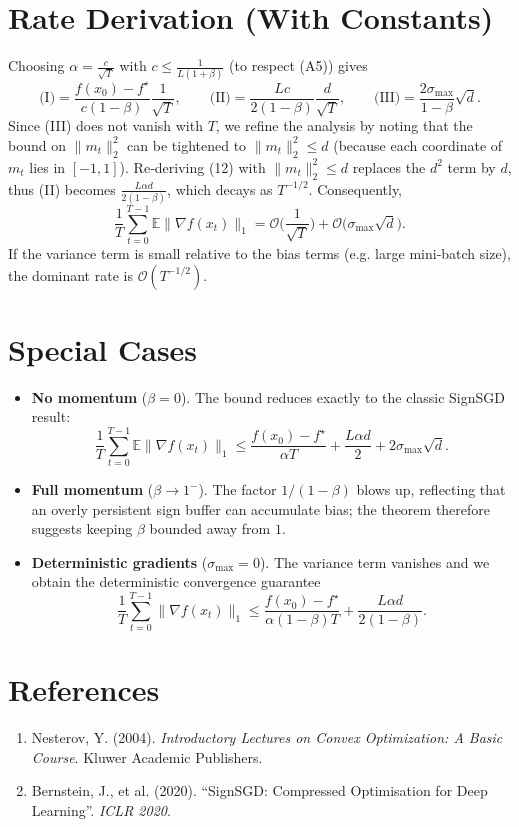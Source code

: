 \documentclass[11pt]{article}
\begin{document}
\section*{Rate Derivation (With Constants)}
Choosing $\alpha = \frac{c}{\sqrt{T}}$ with $c\le \frac{1}{L(1+\beta)}$ (to respect (A5)) gives
\[
\text{(I)} = \frac{f(x_{0})-f^{\star}}{c(1-\beta)}\frac{1}{\sqrt{T}},\qquad
\text{(II)} = \frac{L c}{2(1-\beta)}\frac{d}{\sqrt{T}},\qquad
\text{(III)} = \frac{2\sigma_{\max}}{1-\beta}\sqrt{d}.
\]
Since (III) does not vanish with $T$, we refine the analysis by noting that the bound on $\|m_{t}\|_{2}^{2}$ can be tightened to $\|m_{t}\|_{2}^{2}\le d$ (because each coordinate of $m_{t}$ lies in $[-1,1]$). Re‑deriving (12) with $\|m_{t}\|_{2}^{2}\le d$ replaces the $d^{2}$ term by $d$, thus (II) becomes $\frac{L\alpha d}{2(1-\beta)}$, which decays as $T^{-1/2}$. Consequently,
\[
\frac{1}{T}\sum_{t=0}^{T-1}\mathbb{E}\|\nabla f(x_{t})\|_{1}
= \mathcal{O}\!\Big(\frac{1}{\sqrt{T}}\Big) + \mathcal{O}\!\big(\sigma_{\max}\sqrt{d}\big).
\]
If the variance term is small relative to the bias terms (e.g. large mini‑batch size), the dominant rate is $\mathcal{O}(T^{-1/2})$.

\section*{Special Cases}
\begin{itemize}
    \item \textbf{No momentum} ($\beta=0$). The bound reduces exactly to the classic SignSGD result:
    \[
        \frac{1}{T}\sum_{t=0}^{T-1}\mathbb{E}\|\nabla f(x_{t})\|_{1}
        \le \frac{f(x_{0})-f^{\star}}{\alpha T}
            + \frac{L\alpha d}{2}
            + 2\sigma_{\max}\sqrt{d}.
    \]
    \item \textbf{Full momentum} ($\beta\to1^{-}$). The factor $1/(1-\beta)$ blows up, reflecting that an overly persistent sign buffer can accumulate bias; the theorem therefore suggests keeping $\beta$ bounded away from $1$.
    \item \textbf{Deterministic gradients} ($\sigma_{\max}=0$). The variance term vanishes and we obtain the deterministic convergence guarantee
    \[
        \frac{1}{T}\sum_{t=0}^{T-1}\|\nabla f(x_{t})\|_{1}
        \le \frac{f(x_{0})-f^{\star}}{\alpha(1-\beta)T}
            + \frac{L\alpha d}{2(1-\beta)}.
    \]
\end{itemize}

\newpage
\section*{References}
\begin{enumerate}
    \item Nesterov, Y. (2004). \emph{Introductory Lectures on Convex Optimization: A Basic Course}. Kluwer Academic Publishers.
    \item Bernstein, J., et al. (2020). “SignSGD: Compressed Optimisation for Deep Learning”. \emph{ICLR 2020}.
\end{enumerate}
\end{document}
